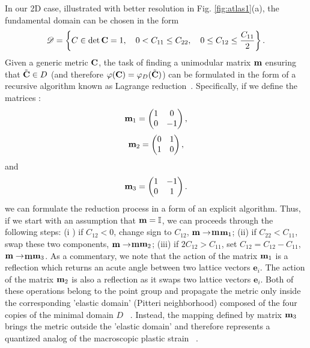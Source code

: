 \documentclass[aps,
superscriptaddress,notitlepage]{revtex4-1}
\def\phi{\varphi}
\begin{document}
  In our 2D case, illustrated with better  resolution  in Fig. \ref{fig:atlas1}(a),  the fundamental domain   can be chosen  in the form ~\cite{Parry1998,Conti2004-sv,Engel2012,pitteri2002continuum}
\begin{equation}
\mathscr{D} = \left\{C \in \det{\bf C}=1, \quad 0<C_{11}\le C_{22},\quad 0\le C_{12}\le \frac{C_{11}}{2}\right\}.
\end{equation}
Given a generic metric $\bf C$, the task of finding a unimodular matrix ${\bf m} $ ensuring that $\tilde{\bf C}\in D$ (and therefore $ \phi({\bf C})= \phi_D(\tilde{\bf C})$) can be formulated in the form of a recursive algorithm known as Lagrange reduction~\cite{Conti2004-sv,Engel2012}. Specifically, if we define the matrices : 
\begin{equation}
{\bf m}_1=\begin{pmatrix}
1 & 0 \\
0 & -1 
\end{pmatrix},
\end{equation}
\begin{equation}
{\bf m}_2=\begin{pmatrix}
0 & 1 \\
1 & 0 
\end{pmatrix},
\end{equation}
and  \begin{equation}
{\bf m}_3=\begin{pmatrix}
1 & -1 \\
0 & 1 
\end{pmatrix}.
\end{equation} 
we can formulate the reduction process in a form of an explicit algorithm. Thus, if we start with an assumption that    ${\bf m} = \mathbb{I}$, we can  proceeds through the following steps: 
(i ) if $C_{12}<0$, change sign to $C_{12}$, ${\bf m}\rightarrow ${\bf m}${\bf m}_1$; 
(ii) if $C_{22}<C_{11}$, swap these two components, ${\bf m}\rightarrow ${\bf m}${\bf m}_2$;
(iii) if $2C_{12}>C_{11}$, set $C_{12}=C_{12}-C_{11}$, ${\bf m}\rightarrow ${\bf m}${\bf m}_3$. 
As a commentary, we note that the action of the matrix ${\bf m}_1$ is a reflection which returns an acute angle between two lattice vectors $\mathbf{e}_i$. The action of the matrix ${\bf m}_2$ is also a reflection as it swaps two lattice vectors $\mathbf{e}_i$. Both of these operations  belong to the point group and propagate the metric only inside the corresponding 'elastic  domain'  (Pitteri neighborhood)  composed of the four copies of the minimal  domain $D$ ~\cite{pitteri2002continuum}. Instead, the mapping defined by matrix ${\bf m}_3$ brings the metric outside the 'elastic domain'  and therefore represents a quantized analog of the macroscopic plastic strain ~\cite{perchikov2024}.
\end{document}
